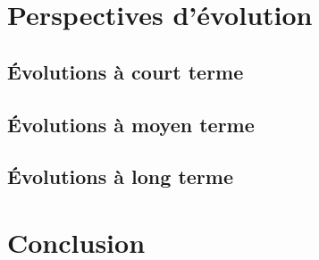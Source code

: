 
\section{Perspectives d'évolution}


\subsection{Évolutions à court terme}


\subsection{Évolutions à moyen terme}


\subsection{Évolutions à long terme}


\section{Conclusion}


